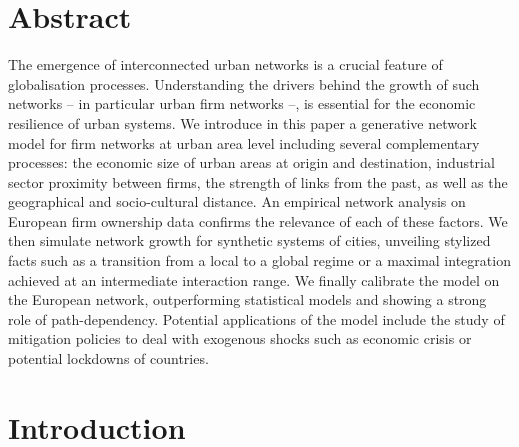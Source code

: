 \documentclass[10pt,letterpaper]{article}
\begin{document}
\section*{Abstract}
The emergence of interconnected urban networks is a crucial feature of globalisation processes. Understanding the drivers behind the growth of such networks -- in particular urban firm networks --, is essential for the economic resilience of urban systems. We introduce in this paper a generative network model for firm networks at urban area level including several complementary processes: the economic size of urban areas at origin and destination, industrial sector proximity between firms, the strength of links from the past, as well as the geographical and socio-cultural distance. An empirical network analysis on European firm ownership data confirms the relevance of each of these factors. We then simulate network growth for synthetic systems of cities, unveiling stylized facts such as a transition from a local to a global regime or a maximal integration achieved at an intermediate interaction range. We finally calibrate the model on the European network, outperforming statistical models and showing a strong role of path-dependency. Potential applications of the model include the study of mitigation policies to deal with exogenous shocks such as economic crisis or potential lockdowns of countries.

\linenumbers


\section*{Introduction}

\end{document}

